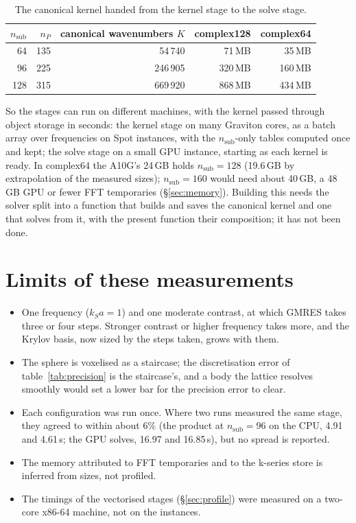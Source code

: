 \documentclass[11pt,a4paper]{article}
\newcommand{\nsub}{n_{\mathrm{sub}}}
\newcommand{\nP}{n_{P}}
\begin{document}
\begin{table}[h]
\centering
\caption{The canonical kernel handed from the kernel stage to the solve stage.}
\label{tab:handover}
\begin{tabular}{rrrrr}
\toprule
$\nsub$ & $\nP$ & canonical wavenumbers $K$ & complex128 & complex64 \\
\midrule
64 & 135 & 54\,740 & 71\,MB & 35\,MB \\
96 & 225 & 246\,905 & 320\,MB & 160\,MB \\
128 & 315 & 669\,920 & 868\,MB & 434\,MB \\
\bottomrule
\end{tabular}
\end{table}

So the stages can run on different machines, with the kernel passed through object storage in seconds: the kernel
stage on many Graviton cores, as a batch array over frequencies on Spot instances, with the $\nsub$-only tables
computed once and kept; the solve stage on a small GPU instance, starting as each kernel is ready. In complex64 the
A10G's 24\,GB holds $\nsub = 128$ (19.6\,GB by extrapolation of the measured sizes); $\nsub = 160$ would need about
40\,GB, a 48\,GB GPU or fewer FFT temporaries (\S\ref{sec:memory}). Building this needs the solver split into a
function that builds and saves the canonical kernel and one that solves from it, with the present function their
composition; it has not been done.

\section{Limits of these measurements}\label{sec:limits}

\begin{itemize}
\item One frequency ($k_S a = 1$) and one moderate contrast, at which GMRES takes three or four steps. Stronger
contrast or higher frequency takes more, and the Krylov basis, now sized by the steps taken, grows with them.
\item The sphere is voxelised as a staircase; the discretisation error of table~\ref{tab:precision} is the
staircase's, and a body the lattice resolves smoothly would set a lower bar for the precision error to clear.
\item Each configuration was run once. Where two runs measured the same stage, they agreed to within about 6\% (the
product at $\nsub = 96$ on the CPU, 4.91 and 4.61\,s; the GPU solves, 16.97 and 16.85\,s), but no spread is
reported.
\item The memory attributed to FFT temporaries and to the k-series store is inferred from sizes, not profiled.
\item The timings of the vectorised stages (\S\ref{sec:profile}) were measured on a two-core x86-64 machine, not on
the instances.
\end{itemize}
\end{document}
